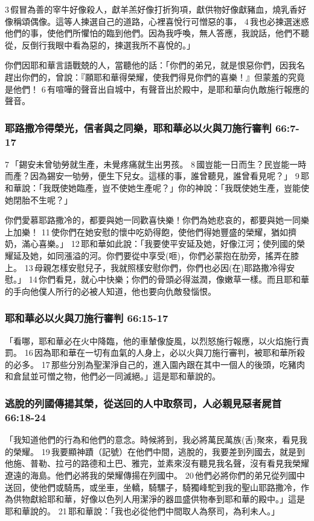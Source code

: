 3 假冒為善的宰牛好像殺人，獻羊羔好像打折狗項，獻供物好像獻豬血，燒乳香好像稱頌偶像。這等人揀選自己的道路，心裡喜悅行可憎惡的事， 4 我也必揀選迷惑他們的事，使他們所懼怕的臨到他們。因為我呼喚，無人答應，我說話，他們不聽從，反倒行我眼中看為惡的，揀選我所不喜悅的。」

你們因耶和華言語戰兢的人，當聽他的話：「你們的弟兄，就是恨惡你們，因我名趕出你們的，曾說：『願耶和華得榮耀，使我們得見你們的喜樂！』但蒙羞的究竟是他們！ 6 有喧嘩的聲音出自城中，有聲音出於殿中，是耶和華向仇敵施行報應的聲音。



\subsubsection{耶路撒冷得榮光，信者與之同樂，耶和華必以火與刀施行審判 66:7-17}
7 「錫安未曾劬勞就生產，未覺疼痛就生出男孩。 8 國豈能一日而生？民豈能一時而產？因為錫安一劬勞，便生下兒女。這樣的事，誰曾聽見，誰曾看見呢？」 9 耶和華說：「我既使她臨產，豈不使她生產呢？」你的神說：「我既使她生產，豈能使她閉胎不生呢？」

你們愛慕耶路撒冷的，都要與她一同歡喜快樂！你們為她悲哀的，都要與她一同樂上加樂！ 11 使你們在她安慰的懷中吃奶得飽，使他們得她豐盛的榮耀，猶如擠奶，滿心喜樂。」 12 耶和華如此說：「我要使平安延及她，好像江河；使列國的榮耀延及她，如同漲溢的河。你們要從中享受(咂)，你們必蒙抱在肋旁，搖弄在膝上。 13 母親怎樣安慰兒子，我就照樣安慰你們，你們也必因(在)耶路撒冷得安慰。」 14 你們看見，就心中快樂；你們的骨頭必得滋潤，像嫩草一樣。而且耶和華的手向他僕人所行的必被人知道，他也要向仇敵發惱恨。

\subsubsection{耶和華必以火與刀施行審判 66:15-17}
「看哪，耶和華必在火中降臨，他的車輦像旋風，以烈怒施行報應，以火焰施行責罰。 16 因為耶和華在一切有血氣的人身上，必以火與刀施行審判，被耶和華所殺的必多。 17 那些分別為聖潔淨自己的，進入園內跟在其中一個人的後頭，吃豬肉和倉鼠並可憎之物，他們必一同滅絕。」這是耶和華說的。

\subsubsection{逃脫的列國傳揚其榮，從送回的人中取祭司，人必親見惡者屍首 66:18-24}
「我知道他們的行為和他們的意念。時候將到，我必將萬民萬族(舌)聚來，看見我的榮耀。 19 我要顯神蹟（記號）在他們中間，逃脫的，我要差到列國去，就是到他施、普勒、拉弓的路德和土巴、雅完，並素來沒有聽見我名聲，沒有看見我榮耀遼遠的海島。他們必將我的榮耀傳揚在列國中。 20 他們必將你們的弟兄從列國中送回，使他們或騎馬，或坐車，坐轎，騎騾子，騎獨峰駝到我的聖山耶路撒冷，作為供物獻給耶和華，好像以色列人用潔淨的器皿盛供物奉到耶和華的殿中。」這是耶和華說的。 21 耶和華說：「我也必從他們中間取人為祭司，為利未人。」


